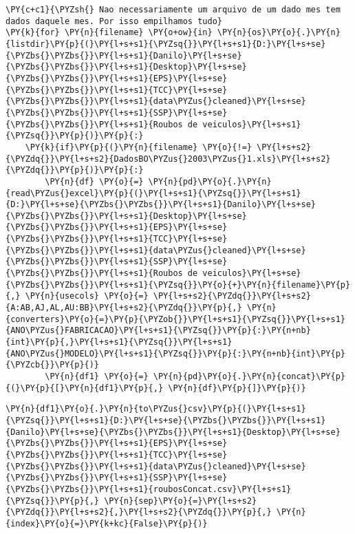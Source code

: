     \begin{tcolorbox}[breakable, size=fbox, boxrule=1pt, pad at break*=1mm,colback=cellbackground, colframe=cellborder]
\begin{Verbatim}[commandchars=\\\{\}]
\PY{c+c1}{\PYZsh{} Nao necessariamente um arquivo de um dado mes tem dados daquele mes. Por isso empilhamos tudo}
\PY{k}{for} \PY{n}{filename} \PY{o+ow}{in} \PY{n}{os}\PY{o}{.}\PY{n}{listdir}\PY{p}{(}\PY{l+s+s1}{\PYZsq{}}\PY{l+s+s1}{D:}\PY{l+s+se}{\PYZbs{}\PYZbs{}}\PY{l+s+s1}{Danilo}\PY{l+s+se}{\PYZbs{}\PYZbs{}}\PY{l+s+s1}{Desktop}\PY{l+s+se}{\PYZbs{}\PYZbs{}}\PY{l+s+s1}{EPS}\PY{l+s+se}{\PYZbs{}\PYZbs{}}\PY{l+s+s1}{TCC}\PY{l+s+se}{\PYZbs{}\PYZbs{}}\PY{l+s+s1}{data\PYZus{}cleaned}\PY{l+s+se}{\PYZbs{}\PYZbs{}}\PY{l+s+s1}{SSP}\PY{l+s+se}{\PYZbs{}\PYZbs{}}\PY{l+s+s1}{Roubos de veiculos}\PY{l+s+s1}{\PYZsq{}}\PY{p}{)}\PY{p}{:}
    \PY{k}{if}\PY{p}{(}\PY{n}{filename} \PY{o}{!=} \PY{l+s+s2}{\PYZdq{}}\PY{l+s+s2}{DadosBO\PYZus{}2003\PYZus{}1.xls}\PY{l+s+s2}{\PYZdq{}}\PY{p}{)}\PY{p}{:}
        \PY{n}{df} \PY{o}{=} \PY{n}{pd}\PY{o}{.}\PY{n}{read\PYZus{}excel}\PY{p}{(}\PY{l+s+s1}{\PYZsq{}}\PY{l+s+s1}{D:}\PY{l+s+se}{\PYZbs{}\PYZbs{}}\PY{l+s+s1}{Danilo}\PY{l+s+se}{\PYZbs{}\PYZbs{}}\PY{l+s+s1}{Desktop}\PY{l+s+se}{\PYZbs{}\PYZbs{}}\PY{l+s+s1}{EPS}\PY{l+s+se}{\PYZbs{}\PYZbs{}}\PY{l+s+s1}{TCC}\PY{l+s+se}{\PYZbs{}\PYZbs{}}\PY{l+s+s1}{data\PYZus{}cleaned}\PY{l+s+se}{\PYZbs{}\PYZbs{}}\PY{l+s+s1}{SSP}\PY{l+s+se}{\PYZbs{}\PYZbs{}}\PY{l+s+s1}{Roubos de veiculos}\PY{l+s+se}{\PYZbs{}\PYZbs{}}\PY{l+s+s1}{\PYZsq{}}\PY{o}{+}\PY{n}{filename}\PY{p}{,} \PY{n}{usecols} \PY{o}{=} \PY{l+s+s2}{\PYZdq{}}\PY{l+s+s2}{A:AB,AJ,AL,AU:BB}\PY{l+s+s2}{\PYZdq{}}\PY{p}{,} \PY{n}{converters}\PY{o}{=}\PY{p}{\PYZob{}}\PY{l+s+s1}{\PYZsq{}}\PY{l+s+s1}{ANO\PYZus{}FABRICACAO}\PY{l+s+s1}{\PYZsq{}}\PY{p}{:}\PY{n+nb}{int}\PY{p}{,}\PY{l+s+s1}{\PYZsq{}}\PY{l+s+s1}{ANO\PYZus{}MODELO}\PY{l+s+s1}{\PYZsq{}}\PY{p}{:}\PY{n+nb}{int}\PY{p}{\PYZcb{}}\PY{p}{)}
        \PY{n}{df1} \PY{o}{=} \PY{n}{pd}\PY{o}{.}\PY{n}{concat}\PY{p}{(}\PY{p}{[}\PY{n}{df1}\PY{p}{,} \PY{n}{df}\PY{p}{]}\PY{p}{)}
\end{Verbatim}
\end{tcolorbox}

    \begin{tcolorbox}[breakable, size=fbox, boxrule=1pt, pad at break*=1mm,colback=cellbackground, colframe=cellborder]
\begin{Verbatim}[commandchars=\\\{\}]
\PY{n}{df1}\PY{o}{.}\PY{n}{to\PYZus{}csv}\PY{p}{(}\PY{l+s+s1}{\PYZsq{}}\PY{l+s+s1}{D:}\PY{l+s+se}{\PYZbs{}\PYZbs{}}\PY{l+s+s1}{Danilo}\PY{l+s+se}{\PYZbs{}\PYZbs{}}\PY{l+s+s1}{Desktop}\PY{l+s+se}{\PYZbs{}\PYZbs{}}\PY{l+s+s1}{EPS}\PY{l+s+se}{\PYZbs{}\PYZbs{}}\PY{l+s+s1}{TCC}\PY{l+s+se}{\PYZbs{}\PYZbs{}}\PY{l+s+s1}{data\PYZus{}cleaned}\PY{l+s+se}{\PYZbs{}\PYZbs{}}\PY{l+s+s1}{SSP}\PY{l+s+se}{\PYZbs{}\PYZbs{}}\PY{l+s+s1}{roubosConcat.csv}\PY{l+s+s1}{\PYZsq{}}\PY{p}{,} \PY{n}{sep}\PY{o}{=}\PY{l+s+s2}{\PYZdq{}}\PY{l+s+s2}{,}\PY{l+s+s2}{\PYZdq{}}\PY{p}{,} \PY{n}{index}\PY{o}{=}\PY{k+kc}{False}\PY{p}{)}
\end{Verbatim}
\end{tcolorbox}